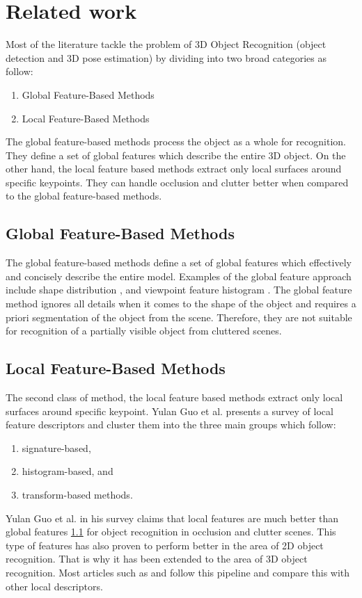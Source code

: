 
\chapter{Related work}
\label{chap:relwork}

Most of the literature tackle the problem of 3D Object Recognition (object detection and 3D pose estimation) by dividing into two broad categories as follow:
\begin{enumerate}
\item Global Feature-Based Methods
\item Local Feature-Based Methods
\end{enumerate}

The global feature-based methods process the object as a whole for recognition. They define a set of global features which describe the entire 3D object.
On the other hand, the local feature based methods extract only local surfaces around specific keypoints. They can handle occlusion and clutter better when compared to the global feature-based methods.


\section{Global Feature-Based Methods} \label{global}

The global feature-based methods define a set of global features which effectively and concisely describe the entire model. Examples of the global feature approach include shape distribution \cite{shapedist}, and viewpoint feature histogram \cite{vfh}.
The global feature method ignores all details when it comes to the shape of the object and requires a priori segmentation of the object from the scene. 
Therefore, they are not suitable for recognition of a partially visible object from cluttered scenes. 

\section{Local Feature-Based Methods}

The second class of method, the local feature based methods extract only local surfaces around specific keypoint. Yulan Guo et al. \cite{survey} presents a survey of local feature descriptors and cluster them into the three main groups which follow:
\begin{enumerate}
\item signature-based,
\item histogram-based, and
\item transform-based methods.
\end{enumerate}

Yulan Guo et al. \cite{survey} in his survey claims that local features are much better than global features \ref{global} for object recognition in occlusion and clutter scenes. 
This type of features has also proven to perform better in the area of 2D object recognition. That is why it has been extended to the area of 3D object recognition. Most articles such as \cite{algFpfh} and \cite{repMatching} follow this pipeline and compare this with other local descriptors.

